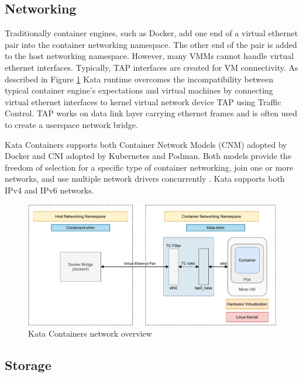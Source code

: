 \subsection{Networking}

Traditionally container engines, such as Docker, add one end of a virtual ethernet pair into the container networking namespace. The other end of the pair is added to the host networking namespace. However, many VMMs cannot handle virtual ethernet interfaces. Typically, TAP interfaces are created for VM connectivity. As described in Figure \ref{fig:KataContainersNetwork} Kata runtime overcomes the incompatibility between typical container engine's expectations and virtual machines by connecting virtual ethernet interfaces to kernel virtual network device TAP using Traffic Control. TAP works on data link layer carrying ethernet frames and is often used to create a userspace network bridge. \cite{KataContainersArchitecture}

Kata Containers supports both Container Network Models (CNM) adopted by Docker and CNI adopted by Kubernetes and Podman. Both models provide the freedom of selection for a specific type of container networking, join one or more networks, and use multiple network drivers concurrently \cite{Randazzo2019}. Kata supports both IPv4 and IPv6 networks.

\begin{figure}[ht]
  \begin{center}
    \includegraphics[width=13.5cm]{images/KataContainersNetwork.pdf}
    \caption{Kata Containers network overview \cite{KataContainersArchitecture}}
    \label{fig:KataContainersNetwork}
  \end{center}
\end{figure}

\subsection{Storage}


